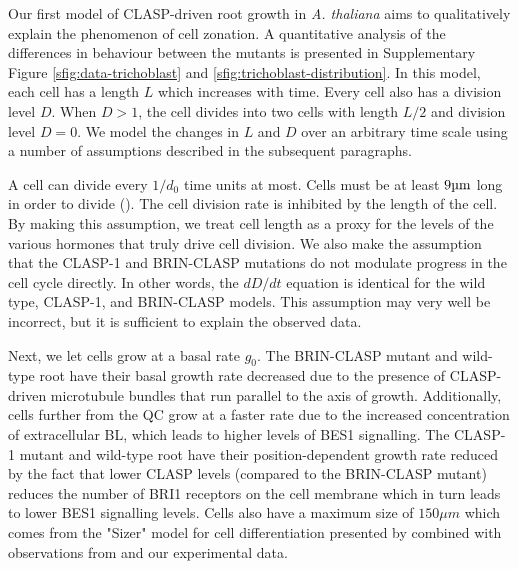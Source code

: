Our first model of CLASP-driven root growth in \emph{A. thaliana} aims to qualitatively explain the phenomenon of cell zonation. A quantitative analysis of the differences in behaviour between the mutants is presented in Supplementary Figure \ref{sfig:data-trichoblast} and \ref{sfig:trichoblast-distribution}. In this model, each cell has a length $L$ which increases with time. Every cell also has a division level $D$. When $D > 1$, the cell divides into two cells with length $L / 2$ and division level $D = 0$. We model the changes in $L$ and $D$ over an arbitrary time scale using a number of assumptions described in the subsequent paragraphs.

\medskip

A cell can divide every $1/d_{0}$ time units at most. Cells must be at least $9\um$ long in order to divide (\cite{verbelen2006}). The cell division rate is inhibited by the length of the cell. By making this assumption, we treat cell length as a proxy for the levels of the various hormones that truly drive cell division. We also make the assumption that the CLASP-1 and BRIN-CLASP mutations do not modulate progress in the cell cycle directly. In other words, the $dD/dt$ equation is identical for the wild type, CLASP-1, and BRIN-CLASP models. This assumption may very well be incorrect, but it is sufficient to explain the observed data.

\medskip

Next, we let cells grow at a basal rate $g_{0}$. The BRIN-CLASP mutant and wild-type root have their basal growth rate decreased due to the presence of CLASP-driven microtubule bundles that run parallel to the axis of growth. Additionally, cells further from the QC grow at a faster rate due to the increased concentration of extracellular BL, which leads to higher levels of BES1 signalling. The CLASP-1 mutant and wild-type root have their position-dependent growth rate reduced by the fact that lower CLASP levels (compared to the BRIN-CLASP mutant) reduces the number of BRI1 receptors on the cell membrane which in turn leads to lower BES1 signalling levels. Cells also have a maximum size of $150 \mu m$ which comes from the "Sizer" model for cell differentiation presented by \cite{pavelescu2018} combined with observations from \cite{verbelen2006} and our experimental data. 

\medskip

